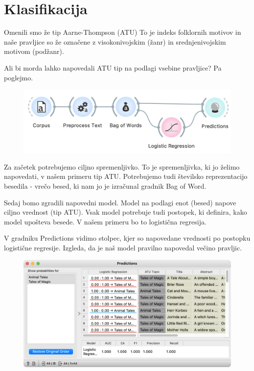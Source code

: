 \chapter{Klasifikacija}
\label{ch:klasifikacija}

Omenili smo že tip Aarne-Thompson (ATU) To je indeks folklornih motivov in naše pravljice so že označene z visokonivojskim (žanr) in srednjenivojskim motivom (podžanr).

Ali bi morda lahko napovedali ATU tip na podlagi vsebine pravljice? Pa poglejmo.

\begin{figure}[h]
    \centering
    \includegraphics[width=0.9\linewidth]{klasifikacija-wf.png}%
    \caption{ }
    \label{fig:002-stop-words}
\end{figure}

Za začetek potrebujemo ciljno spremenljivko. To je spremenljivka, ki jo želimo napovedati, v našem primeru tip ATU. Potrebujemo tudi številsko reprezentacijo besedila - vrečo besed, ki nam jo je izračunal gradnik Bag of Word.

Sedaj bomo zgradili napovedni model. Model na podlagi enot (besed) napove ciljno vrednost (tip ATU). Vsak model potrebuje tudi postopek, ki definira, kako model upošteva besede. V našem primeru bo to logistična regresija.

V gradniku Predictions vidimo stolpec, kjer so napovedane vrednosti po postopku logistične regresije. Izgleda, da je naš model pravilno napovedal večino pravljic.

\begin{figure}[h]
    \centering
    \includegraphics[width=0.95\linewidth]{predictions.png}%
    \caption{ }
    \label{fig:002-word-cloud}
\end{figure}